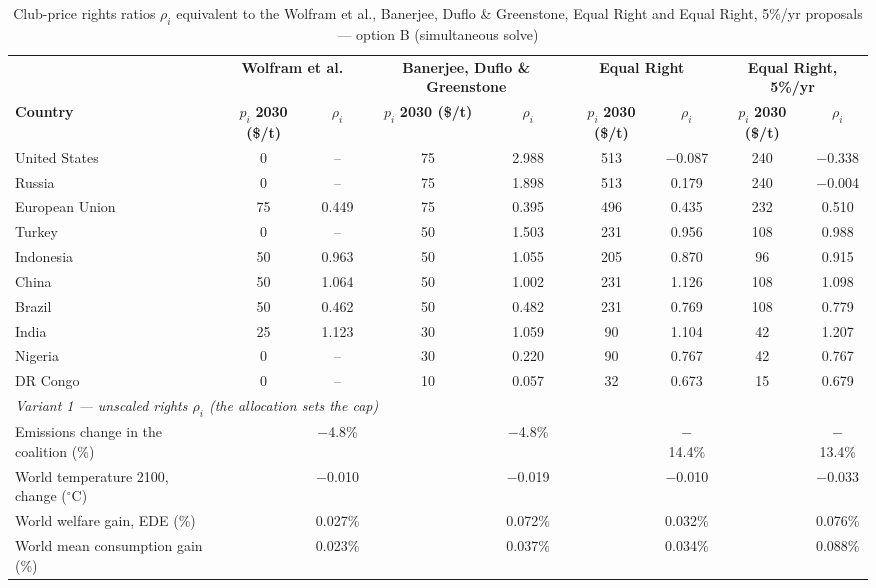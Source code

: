 \begin{table}[htbp]
\centering
\small
\caption{Club-price rights ratios $\rho_i$ equivalent to the Wolfram et al., Banerjee, Duflo \& Greenstone, Equal Right and Equal Right, 5\%/yr proposals --- option B (simultaneous solve)}
\renewcommand{\arraystretch}{1.15}
\begin{tabular}{lcccccccc}
  \toprule
  & \multicolumn{2}{c}{\textbf{Wolfram et al.}} & \multicolumn{2}{c}{\textbf{Banerjee, Duflo \& Greenstone}} & \multicolumn{2}{c}{\textbf{Equal Right}} & \multicolumn{2}{c}{\textbf{Equal Right, 5\%/yr}} \\
  \cmidrule(lr){2-3} \cmidrule(lr){4-5} \cmidrule(lr){6-7} \cmidrule(lr){8-9}
  \textbf{Country} & $p_i$ \textbf{2030 (\$/t)} & $\rho_i$ & $p_i$ \textbf{2030 (\$/t)} & $\rho_i$ & $p_i$ \textbf{2030 (\$/t)} & $\rho_i$ & $p_i$ \textbf{2030 (\$/t)} & $\rho_i$ \\
  \midrule
  United States & 0 & -- & 75 & 2.988 & 513 & $-$0.087 & 240 & $-$0.338 \\
  Russia & 0 & -- & 75 & 1.898 & 513 & 0.179 & 240 & $-$0.004 \\
  European Union & 75 & 0.449 & 75 & 0.395 & 496 & 0.435 & 232 & 0.510 \\
  Turkey & 0 & -- & 50 & 1.503 & 231 & 0.956 & 108 & 0.988 \\
  Indonesia & 50 & 0.963 & 50 & 1.055 & 205 & 0.870 & 96 & 0.915 \\
  China & 50 & 1.064 & 50 & 1.002 & 231 & 1.126 & 108 & 1.098 \\
  Brazil & 50 & 0.462 & 50 & 0.482 & 231 & 0.769 & 108 & 0.779 \\
  India & 25 & 1.123 & 30 & 1.059 & 90 & 1.104 & 42 & 1.207 \\
  Nigeria & 0 & -- & 30 & 0.220 & 90 & 0.767 & 42 & 0.767 \\
  DR Congo & 0 & -- & 10 & 0.057 & 32 & 0.673 & 15 & 0.679 \\
  \midrule
  \multicolumn{9}{l}{\textit{Variant 1 --- unscaled rights $\rho_i$ (the allocation sets the cap)}} \\
  \quad Emissions change in the coalition (\%) &  & $-$4.8\% &  & $-$4.8\% &  & $-$14.4\% &  & $-$13.4\% \\
  \quad World temperature 2100, change ($^\circ$C) &  & $-$0.010 &  & $-$0.019 &  & $-$0.010 &  & $-$0.033 \\
  \quad World welfare gain, EDE (\%) &  & 0.027\% &  & 0.072\% &  & 0.032\% &  & 0.076\% \\
  \quad World mean consumption gain (\%) &  & 0.023\% &  & 0.037\% &  & 0.034\% &  & 0.088\% \\

\end{tabular}
\end{table}

